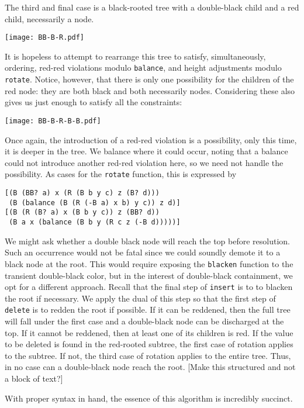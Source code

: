 \documentclass[preprint]{sigplanconf}
\begin{document}
The third and final case is a black-rooted tree with a double-black child and a red child, necessarily a node.
\begin{center}
\texttt{[image: BB-B-R.pdf]}
\end{center}
It is hopeless to attempt to rearrange this tree to satisfy, simultaneously, ordering, red-red violations modulo \texttt{balance}, and height adjustments modulo \texttt{rotate}. Notice, however, that there is only one possibility for the children of the red node: they are both black and both necessarily nodes. Considering these also gives us just enough to satisfy all the constraints:
\begin{center}
\texttt{[image: BB-B-R-B-B.pdf]}
\end{center}
Once again, the introduction of a red-red violation is a possibility, only this time, it is deeper in the tree. We balance where it could occur, noting that a balance could not introduce another red-red violation here, so we need not handle the possibility. As cases for the \texttt{rotate} function, this is expressed by
\begin{verbatim}
[(B (BB? a) x (R (B b y c) z (B? d)))
 (B (balance (B (R (-B a) x b) y c)) z d)]
[(B (R (B? a) x (B b y c)) z (BB? d))
 (B a x (balance (B b y (R c z (-B d)))))]
\end{verbatim}

We might ask whether a double black node will reach the top before resolution. Such an occurrence would not be fatal since we could soundly demote it to a black node at the root. This would require exposing the \texttt{blacken} function to the transient double-black color, but in the interest of double-black containment, we opt for a different approach. Recall that the final step of \texttt{insert} is to to blacken the root if necessary. We apply the dual of this step so that the first step of \texttt{delete} is to redden the root if possible. If it can be reddened, then the full tree will fall under the first case and a double-black node can be discharged at the top. If it cannot be reddened, then at least one of its children is red. If the value to be deleted is found in the red-rooted subtree, the first case of rotation applies to the subtree. If not, the third case of rotation applies to the entire tree. Thus, in no case can a double-black node reach the root. [Make this structured and not a block of text?]

With proper syntax in hand, the essence of this algorithm is incredibly succinct.
\end{document}

